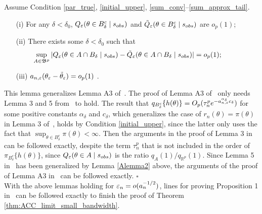 \begin{lemma}\label{Alemma4} 
Assume Condition \ref{par_true}, \ref{initial_upper}, \ref{sum_conv}--\ref{sum_approx_tail}. 
	\begin{enumerate}
		\item[(i)] For any $\delta<\delta_{0}$, $Q_{\varepsilon}(\theta\in B_{\delta}^{c}\mid s_{\relax obs})$
		and $\tilde{Q}_{\varepsilon}(\theta\in B_{\delta}^{c}\mid s_{\relax obs})$ are $o_{p}(1)$; 
		\item[(ii)] There exists some $\delta<\delta_{0}$ such that 
		\[
		\hspace{-1cm}\sup_{A\in\mathfrak{B}^{p}}|Q_{\veps}(\theta\in A\cap B_{\delta}\mid s_{\rm obs})-\tilde{Q}_{\veps}(\theta\in A\cap B_{\delta}\mid s_{\rm obs})|=o_{p}(1);
		\]
		\item[(iii)] $a_{n,\varepsilon}(\theta_{\varepsilon}-\tilde{\theta}_{\varepsilon})=o_{p}(1)$ . 
	\end{enumerate}\end{lemma}
	This lemma generalizes Lemma A3 of~\cite{Li2017}. The proof of Lemma A3 of~\cite{Li2017} only needs Lemma 3 and 5 from~\cite{Li2016} to hold. The result that  $q_{B_{\delta}^{c}}\{h(\theta)\}=O_{p}(\tau_{n}^{p}e^{-a_{n,\varepsilon}^{\alpha_{\delta}}c_{\delta}})$
	for some positive constants $\alpha_{\delta}$ and $c_{\delta}$, which generalizes the case of $r_{n}(\theta)=\pi(\theta)$ in Lemma 3 of~\cite{Li2016}, holds by Condition \ref{initial_upper}, since the latter only uses the fact that 
	$\sup_{\theta\in B_{\delta}^{c}}\pi(\theta)<\infty$.
	Then the arguments in the proof of Lemma 3 in~\cite{Li2016} can be followed exactly, despite the term $\tau_{n}^{p}$ that is not included in the order of $\pi_{B_{\delta}^{c}}\{h(\theta)\}$, since $Q_{\varepsilon}(\theta\in A\mid s_{{\relax obs}})$
	is the ratio $q_{A}(1)/q_{\mathbb{R}^{p}}(1)$. Since Lemma 5 in~\cite{Li2016} has been generalized by Lemma \eqref{Alemma2} above, the arguments of the proof of Lemma A3 in~\cite{Li2017} can be followed exactly.
	\hfill{$\square$} \\
	

With the above lemmas holding for $\varepsilon_n = o(a_n^{-1/2})$, lines for
proving %
Proposition 1 in~\cite{Li2017} can be followed  
exactly to finish the proof of Theorem \ref{thm:ACC_limit_small_bandwidth}. 

